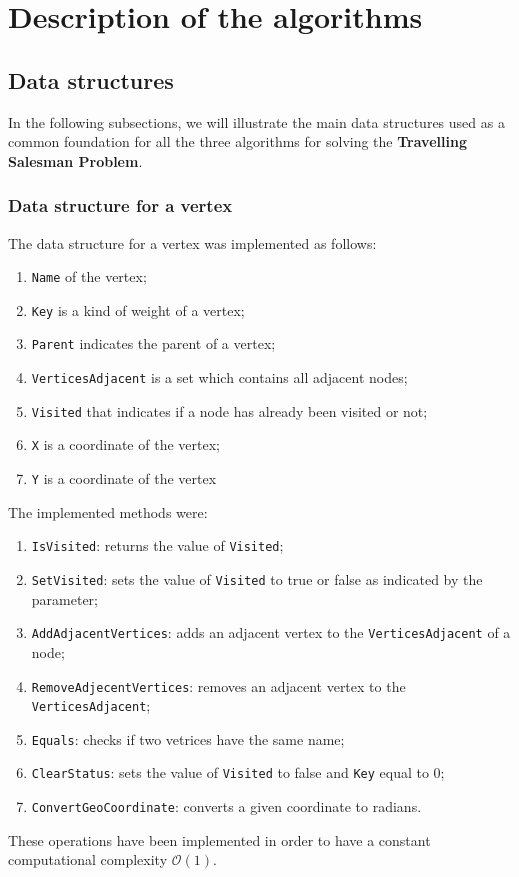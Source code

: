 \section{Description of the algorithms}

\subsection{Data structures}
In the following subsections, we will illustrate the main data structures used as a common foundation for all the 
three algorithms for solving the \textbf{Travelling Salesman Problem}.

\subsubsection{Data structure for a vertex}
The data structure for a vertex was implemented as follows:
\begin{enumerate}
    \item \verb|Name| of the vertex;
    \item \verb|Key| is a kind of weight of a vertex;
    \item \verb|Parent| indicates the parent of a vertex;
    \item \verb|VerticesAdjacent| is a set which contains all adjacent nodes; 
    \item \verb|Visited| that indicates if a node has already been visited or not;
    \item \verb|X| is a coordinate of the vertex;
    \item \verb|Y| is a coordinate of the vertex
\end{enumerate}
\noindent
The implemented methods were:
\begin{enumerate}
    \item \verb|IsVisited|: returns the value of \verb|Visited|;
    \item \verb|SetVisited|: sets the value of \verb|Visited| to true or false as indicated by the parameter;
    \item \verb|AddAdjacentVertices|: adds an adjacent vertex to the \verb|VerticesAdjacent| of a node;
    \item \verb|RemoveAdjecentVertices|: removes an adjacent vertex to the \verb|VerticesAdjacent|;
    \item \verb|Equals|: checks if two vetrices have the same name;
    \item \verb|ClearStatus|: sets the value of \verb|Visited| to false and \verb|Key| equal to 0;
    \item \verb|ConvertGeoCoordinate|: converts a given coordinate to radians.
\end{enumerate}
These operations have been implemented in order to have a constant computational complexity $\mathcal{O}(1)$.

